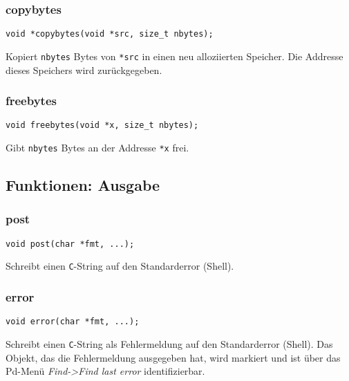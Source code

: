 \documentclass[12pt, a4paper,austrian, titlepage]{article}
\begin{document}
\begin{appendix}
\subsubsection{copybytes}
\begin{verbatim}
void *copybytes(void *src, size_t nbytes);
\end{verbatim}
Kopiert  \verb+nbytes+ Bytes von \verb+*src+ in einen neu alloziierten Speicher.
Die Addresse dieses Speichers wird zurückgegeben.

\subsubsection{freebytes}
\begin{verbatim}
void freebytes(void *x, size_t nbytes);
\end{verbatim}
Gibt \verb+nbytes+ Bytes an der Addresse \verb+*x+ frei.

\subsection{Funktionen: Ausgabe}
\subsubsection{post}
\begin{verbatim}
void post(char *fmt, ...);
\end{verbatim}

Schreibt einen {\tt C}-String auf den Standarderror (Shell).

\subsubsection{error}
\begin{verbatim}
void error(char *fmt, ...);
\end{verbatim}

Schreibt einen {\tt C}-String als Fehlermeldung auf den Standarderror (Shell).
Das Objekt, das die Fehlermeldung ausgegeben hat, wird markiert und
ist über das Pd-Menü {\em Find->Find last error} identifizierbar.

\end{appendix}
\end{document}
